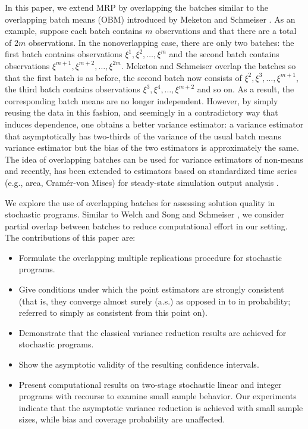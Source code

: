 \documentclass[12pt]{article}
\newcommand{\xit}{\xi}
\begin{document}
In this paper, we extend MRP by overlapping the batches similar to the overlapping batch means (OBM) introduced by Meketon and Schmeiser \citep{Meketon1984}. 
As an example, suppose each batch contains $m$ observations and that there are a total of $2m$ observations.
In the nonoverlapping case, there are only two batches: the first batch contains observations $\xit^1, \xit^2, \dots, \xit^m$ and the second batch contains observations $\xit^{m+1}, \xit^{m+2}, \dots, \xit^{2m}$.   
Meketon and Schmeiser \citep{Meketon1984} overlap the batches so that the first batch is as before, the second batch now consists of $\xit^2, \xit^3, \dots, \xit^{m+1}$, the third batch contains observations $\xit^3, \xit^4, \dots, \xit^{m+2}$ and so on. 
As a result, the corresponding batch means are no longer independent. 
However, by simply reusing the data in this fashion, and seemingly in a contradictory way that induces dependence, one obtains a better variance estimator: a variance estimator that asymptotically has two-thirds of the variance of the usual batch means variance estimator but the bias of the two estimators is approximately the same.  
The idea of overlapping batches can be used for variance estimators of non-means \citep{SAH90} and recently, has been extended to estimators based on standardized time series (e.g., area, Cram\'{e}r-von Mises) for steady-state simulation output analysis \citep{Alexopoulos01012007,Alexopoulos2007}.

We explore the use of overlapping batches for assessing solution quality in stochastic programs.
Similar to Welch \citep{Welch1987} and Song and Schmeiser \citep{Song1992}, we consider partial overlap between batches to reduce computational effort in our setting.
The contributions of this paper are:
\begin{itemize}
	\item Formulate the overlapping multiple replications procedure for stochastic programs.
	\item Give conditions under which the point estimators are strongly consistent (that is, they converge almost surely (a.s.) as opposed in to in probability; referred to simply as consistent from this point on).
	\item Demonstrate that the classical variance reduction results are achieved for stochastic programs.
	\item Show the asymptotic validity of the resulting confidence intervals.
	\item Present computational results on two-stage stochastic linear and integer programs with recourse to examine small sample behavior.  
		Our experiments indicate that the asymptotic variance reduction is achieved with small sample sizes, while bias and coverage probability are unaffected.
\end{itemize}
\end{document}

